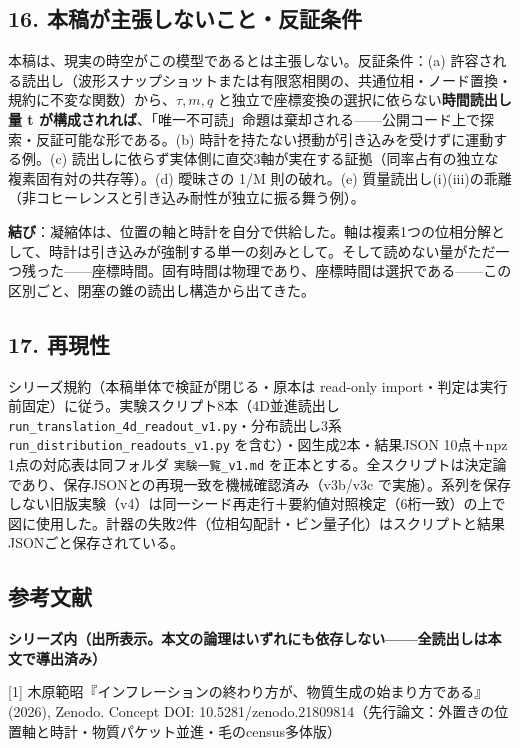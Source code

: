 \documentclass[
  a4paper,
]{ltjsarticle}
\begin{document}
\subsection{16.
本稿が主張しないこと・反証条件}\label{ux672cux7a3fux304cux4e3bux5f35ux3057ux306aux3044ux3053ux3068ux53cdux8a3cux6761ux4ef6}

本稿は、現実の時空がこの模型であるとは主張しない。反証条件：(a)
許容される読出し（波形スナップショットまたは有限窓相関の、共通位相・ノード置換・規約に不変な関数）から、\(\tau, m, q\)
と独立で座標変換の選択に依らない\textbf{時間読出し量 t
が構成されれば}、「唯一不可読」命題は棄却される------公開コード上で探索・反証可能な形である。(b)
時計を持たない摂動が引き込みを受けずに運動する例。(c)
読出しに依らず実体側に直交3軸が実在する証拠（同率占有の独立な複素固有対の共存等）。(d)
曖昧さの 1/M 則の破れ。(e)
質量読出し(i)(iii)の乖離（非コヒーレンスと引き込み耐性が独立に振る舞う例）。

\textbf{結び}：凝縮体は、位置の軸と時計を自分で供給した。軸は複素1つの位相分解として、時計は引き込みが強制する単一の刻みとして。そして読めない量がただ一つ残った------座標時間。固有時間は物理であり、座標時間は選択である------この区別ごと、閉塞の錐の読出し構造から出てきた。

\subsection{17. 再現性}\label{ux518dux73feux6027}

シリーズ規約（本稿単体で検証が閉じる・原本は read-only
import・判定は実行前固定）に従う。実験スクリプト8本（4D並進読出し
\texttt{run\_translation\_4d\_readout\_v1.py}・分布読出し3系
\texttt{run\_distribution\_readouts\_v1.py}
を含む）・図生成2本・結果JSON 10点＋npz 1点の対応表は同フォルダ
\texttt{実験一覧\_v1.md}
を正本とする。全スクリプトは決定論であり、保存JSONとの再現一致を機械確認済み（v3b/v3c
で実施）。系列を保存しない旧版実験（v4）は同一シード再走行＋要約値対照検定（6桁一致）の上で図に使用した。計器の失敗2件（位相勾配計・ビン量子化）はスクリプトと結果JSONごと保存されている。

\subsection{参考文献}\label{ux53c2ux8003ux6587ux732e}

\textbf{シリーズ内（出所表示。本文の論理はいずれにも依存しない------全読出しは本文で導出済み）}

{[}1{]}
木原範昭『インフレーションの終わり方が、物質生成の始まり方である』(2026),
Zenodo. Concept DOI:
10.5281/zenodo.21809814（先行論文：外置きの位置軸と時計・物質パケット並進・毛のcensus多体版）
\end{document}
